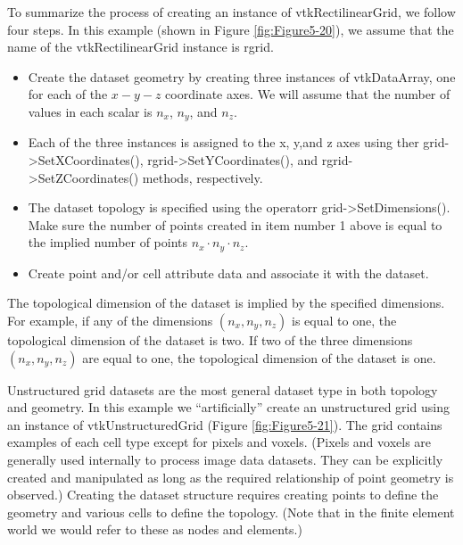 \begin{description}[leftmargin=0cm,labelindent=0cm]
To summarize the process of creating an instance of vtkRectilinearGrid, we follow four steps. In this example (shown in Figure \ref{fig:Figure5-20}), we assume that the name of the vtkRectilinearGrid instance is rgrid.

\begin{itemize}

	\item Create the dataset geometry by creating three instances of vtkDataArray, one for each of the $x-y-z$ coordinate axes. We will assume that the number of values in each scalar is $n_x$, $n_y$, and $n_z$.

	\item Each of the three instances is assigned to the x, y,and z axes using ther grid->SetXCoordinates(), rgrid->SetYCoordinates(), and rgrid->SetZCoordinates() methods, respectively.

	\item The dataset topology is specified using the operatorr grid->SetDimensions(). Make sure the number of points created in item number 1 above is equal to the implied number of points $n_x⋅n_y⋅n_z$.

	\item Create point and/or cell attribute data and associate it with the dataset.

\end{itemize}

The topological dimension of the dataset is implied by the specified dimensions. For example, if any of the dimensions $(n_x, n_y, n_z)$ is equal to one, the topological dimension of the dataset is two. If two of the three dimensions $(n_x, n_y, n_z)$ are equal to one, the topological dimension of the dataset is one.

\item[Create an Unstructured Grid Dataset.]

Unstructured grid datasets are the most general dataset type in both topology and geometry. In this example we ``artificially'' create an unstructured grid using an instance of vtkUnstructuredGrid (Figure \ref{fig:Figure5-21}). The grid contains examples of each cell type except for pixels and voxels. (Pixels and voxels are generally used internally to process image data datasets. They can be explicitly created and manipulated as long as the required relationship of point geometry is observed.) Creating the dataset structure requires creating points to define the geometry and various cells to define the topology. (Note that in the finite element world we would refer to these as nodes and elements.)


\end{description}
